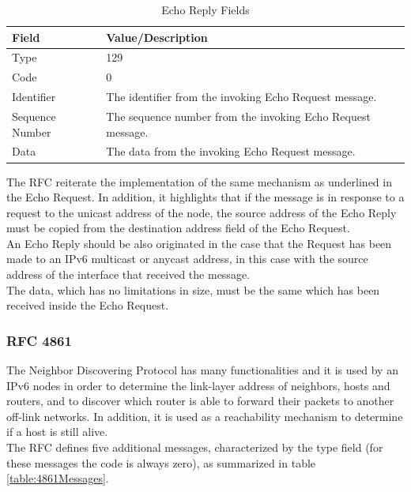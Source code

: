 \documentclass[12pt]{article}
\begin{document}
\begin{savenotes}
\begin{table}[!htpb]
\centering
\addtolength{\tabcolsep}{3pt}
\begin{tabular}{|L{2.0cm}|L{11.0cm}|}
\hline
Field&Value/Description\\
\hline
Type&129\\
\hline
Code&0\\
\hline
Identifier&The identifier from the invoking Echo Request message.\\
\hline
Sequence Number&The sequence number from the invoking Echo Request message.\\
\hline
Data&The data from the invoking Echo Request message.\\
\hline
\end{tabular}
\caption{Echo Reply Fields}
\label{table:echoRepFields}
\end{table}
\end{savenotes}
The RFC reiterate the implementation of the same mechanism as underlined in the Echo Request. In addition, it highlights that if the message is in response to a request to the unicast address of the node, the source 
address of the Echo Reply must be copied from the destination address field of the Echo Request.\\
An Echo Reply should be also originated in the case that the Request has been made to an IPv6 multicast or anycast address, in this case with the source address of the interface that received the message.\\
The data, which has no limitations in size, must be the same which has been received inside the Echo Request.


\subsubsection{RFC 4861}
\label{subsub:4861}

The Neighbor Discovering Protocol has many functionalities and it is used by an IPv6 nodes in order to determine the link-layer address of neighbors, hosts and routers, and to discover which router is able to forward 
their packets to another off-link networks. In addition, it is used as a reachability mechanism to determine if a host is still alive.\\
The RFC defines five additional messages, characterized by the type field (for these messages the code is always zero), as summarized in table \ref{table:4861Messages}.
\end{document}

